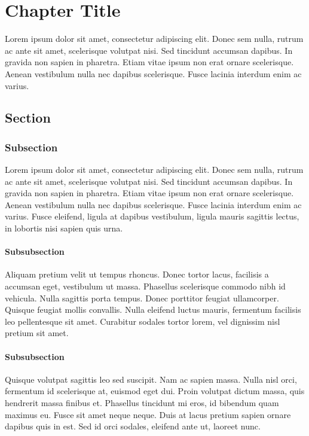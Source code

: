 \documentclass[../report_tablet.tex]{subfiles}
\begin{document}
\pagestyle{custom}
\chapter{Chapter Title}
Lorem ipsum dolor sit amet, consectetur adipiscing elit.
Donec sem nulla, rutrum ac ante sit amet, scelerisque volutpat nisi.
Sed tincidunt accumsan dapibus. In gravida non sapien in pharetra. Etiam vitae ipsum non erat ornare scelerisque.
Aenean vestibulum nulla nec dapibus scelerisque. Fusce lacinia interdum enim ac varius.

\section{Section}
\subsection{Subsection}
Lorem ipsum dolor sit amet, consectetur adipiscing elit.
Donec sem nulla, rutrum ac ante sit amet, scelerisque volutpat nisi.
Sed tincidunt accumsan dapibus. In gravida non sapien in pharetra. Etiam vitae ipsum non erat ornare scelerisque.
Aenean vestibulum nulla nec dapibus scelerisque. Fusce lacinia interdum enim ac varius.
Fusce eleifend, ligula at dapibus vestibulum, ligula mauris sagittis lectus, in lobortis nisi sapien quis urna.

\subsubsection{Subsubsection}
Aliquam pretium velit ut tempus rhoncus. Donec tortor lacus, facilisis a accumsan eget, vestibulum
ut massa. Phasellus scelerisque commodo nibh id vehicula. Nulla sagittis porta tempus.
Donec porttitor feugiat ullamcorper. Quisque feugiat mollis convallis. Nulla eleifend luctus mauris,
fermentum facilisis leo pellentesque sit amet. Curabitur sodales tortor lorem,
vel dignissim nisl pretium sit amet.

\subsubsection{Subsubsection}
Quisque volutpat sagittis leo sed suscipit. Nam ac sapien massa. Nulla nisl orci, fermentum id
scelerisque at, euismod eget dui. Proin volutpat dictum massa, quis hendrerit massa finibus et.
Phasellus tincidunt mi eros, id bibendum quam maximus eu. Fusce sit amet neque neque. Duis at lacus
pretium sapien ornare dapibus quis in est. Sed id orci sodales, eleifend ante ut, laoreet nunc.
\end{document}
